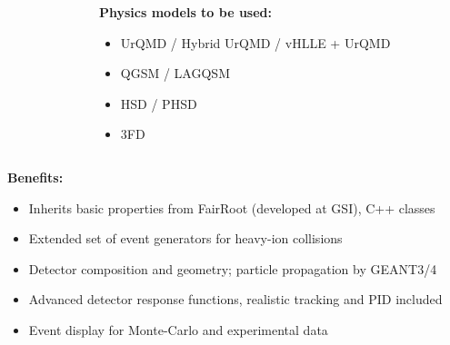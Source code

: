 \documentclass[dvipsnames] {beamer}
\begin{document}
\begin{frame}[shrink=35]
\begin{columns}[c]
\begin{block}{}
\begin{figure}[H]
      \end{figure}
    \end{block}
    \begin{block}{\bf \centering Physics models to be used: }
      \begin{itemize}
      \item UrQMD / Hybrid UrQMD / vHLLE + UrQMD
      \item QGSM / LAGQSM
      \item HSD / PHSD
      \item 3FD
      \end{itemize}
    \end{block}
  \end{columns}
  \begin{columns}[c]
    \begin{block}{\bf \centering Benefits:}
      \begin{itemize}
      \item Inherits basic properties from FairRoot (developed at GSI), C++ classes
      \item Extended set of event generators for heavy-ion collisions
      \item Detector composition and geometry; particle propagation by GEANT3/4
      \item Advanced detector response functions, realistic tracking and PID included
      \item Event display for Monte-Carlo and experimental data 
      \end{itemize}
    \end{block}
  \end{columns}
\end{frame}
\end{document}
